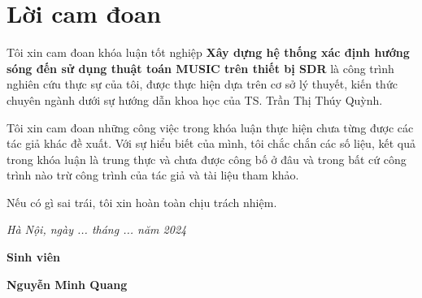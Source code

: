 \clearpage
{}

\chapter*{Lời cam đoan}

Tôi xin cam đoan khóa luận tốt nghiệp \textbf{Xây dựng hệ thống xác định hướng sóng đến sử dụng thuật toán MUSIC trên thiết bị SDR} là công trình nghiên cứu thực sự của tôi, được thực hiện dựa trên cơ sở lý thuyết, kiến thức chuyên ngành dưới sự hướng dẫn khoa học của TS. Trần Thị Thúy Quỳnh.

Tôi xin cam đoan những công việc trong khóa luận thực hiện chưa từng được các tác giả khác đề xuất. Với sự hiểu biết của mình, tôi chắc chắn các số liệu, kết quả trong khóa luận là trung thực và chưa được công bố ở đâu và trong bất cứ công trình nào trừ công trình của tác giả và tài liệu tham khảo.

Nếu có gì sai trái, tôi xin hoàn toàn chịu trách nhiệm.

\vspace{1cm}
\hspace{7cm}\textit{Hà Nội, ngày ... tháng ... năm 2024}

\hspace{9.4cm}\textbf{Sinh viên}
\vspace{2.5cm}


\hspace{8.5cm}\textbf{Nguyễn Minh Quang}

